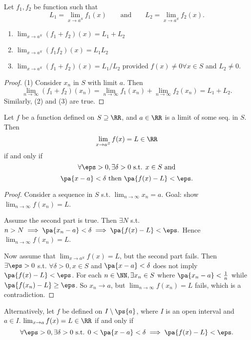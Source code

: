\documentclass[11pt]{scrartcl}
\numberwithin{equation}{section}
\begin{document}
\begin{proposition}
    Let $f_1,f_2$ be function such that 
    \[L_1=\lim_{x\rightarrow a^S}f_1(x) \qquad\text{and}\qquad  
    L_2=\lim_{x\rightarrow a^S}f_2(x).\]
    \begin{enumerate}
        \item $\lim_{x\rightarrow a^S}(f_1+f_2)(x) = L_1+L_2$
        \item $\lim_{x\rightarrow a^S}(f_1f_2)(x) = L_1L_2$
        \item $\lim_{x\rightarrow a^S}(f_1+f_2)(x) = L_1/L_2$ provided 
        $f(x)\neq0 \forall x\in S$ and $L_2\neq 0$.
    \end{enumerate}
\end{proposition}

\begin{proof}
    (1) Consider $x_n$ in $S$ with limit $a$. 
    Then 
    \[
        \lim_{n\rightarrow \infty}(f_1+f_2)(x_n)=\lim_{n\rightarrow \infty}f_1(x_n)+\lim_{n\rightarrow \infty}f_2(x_n)=L_1+L_2.
    \]
    Similarly, (2) and (3) are true.
\end{proof}

\begin{theorem}
    Let $f$ be a function defined on $S\supseteq\RR$, and $a\in\RR$
    is a limit of some seq. in $S$. Then 
    \[ \lim_{x\rightarrow a^S}f(x)=L\in \RR\]
    if and only if 
    \[\forall \eps>0, \exists\delta>0 \text{ s.t. } x\in S\text{ and} \]
    \[\pa{x-a}<\delta \text{ then } \pa{f(x)-L}<\eps. \]
\end{theorem}

\begin{proof}
    Consider a sequence in $S$ s.t. $\lim_{n\rightarrow \infty}x_n=a$.
    Goal: show $\lim_{n\rightarrow \infty}f(x_n)=L$.

    Assume the second part is true. Then $\exists N$ s.t. 
    $n>N\implies \pa{x_n-a}<\delta\implies\pa{f(x)-L}<\eps.$
    Hence $\lim_{n\rightarrow \infty}f(x_n)=L$.

    Now assume that $\lim_{x\rightarrow a^S}f(x)=L$, but the second part 
    fails. Then $\exists \eps>0$ s.t. $\forall\delta>0,x\in S$ and 
    $\pa{x-a}<\delta$ does not imply $\pa{f(x)-L}<\eps$.
    For each $n\in\NN, \exists x_n\in S$ where $\pa{x_n-a}<\frac{1}{n}$
    while $\pa{f(x_n)-L}\geq\eps$. So $x_n\to a$, but 
    $\lim_{n\rightarrow \infty}f(x_n)=L$ fails, which is a contradiction.
\end{proof}
Alternatively,
let $f$ be defined on $I\setminus\ps{a}$, where $I$ is an open interval 
and $a\in I$. $\lim_{x\rightarrow a}f(x)=L\in\RR$ if and only if 
\[\forall \eps>0, \exists\delta>0 \text{ s.t. } 0<\pa{x-a}<\delta 
\implies \pa{f(x)-L}<\eps. \]
\end{document}
